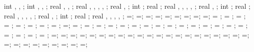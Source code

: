 {{int \showleftpinsup, \showrightpinsup, \showbottompinsup;
int \nbotpin, \ibot, \ijkk;
real \botpinx, \botpinspace, \bottomlength;
real \lefttriw, \leftlinew, \leftlined, \leftlinet, \leftradratio;
real \leftxvalue, \leftyvalue;
int \leftshowcircle;
real \leftrotpin;
real \righttriw, \rightlinew, \rightlined, \rightlinet, \rightradratio;
real \rightxvalue, \rightyvalue;
int \rightshowcircle;
real \rightrotpin;
real \bottomtriw, \bottomlinew, \bottomlined, \bottomlinet, \bottomradratio;
real \bottomxvalue, \bottomyvalue;
int \bottomshowcircle;
real \bottomrotpin;
real \hsdistleft, \hsdistright, \hsdistbottom, \hsinnerlinethk, \thinlinethk;
\hsdistleft=\hsdistleft;
\hsdistright=\hsdistright;
\hsdistbottom=\hsdistbottom;
\hsinnerlinethk=\hsinnerlinethk;
\thinlinethk=\thinlinethk;
\hsdistleft=\hsdistleft;
\hsdistright=\hsdistright;
\hsdistbottom=\hsdistbottom;
\hsinnerlinethk=\hsinnerlinethk;
\storyheight = \storyheight;
\baywidth = \baywidth;
\startx = \startx;
\starty = \starty;
\supportwidth = \supportwidth;
\supportheight = \supportheight;
\isolationwidth = \isolationwidth;
\isolationdepth = \isolationdepth;
\isoshift=\isoshift;
\foundationdepth = \foundationdepth;
\linet = \linet;
\beamlinet = \beamlinet;
\collinet = \collinet;
\baselinet = \baselinet;
\isolinet = \isolinet;
\massrad = \massrad;
\foundsidew = \foundsidew;
\leftsoildist = \leftsoildist;
\rightsoildist = \rightsoildist;
\leftsoildepth = \leftsoildepth;
\rightsoildepth = \rightsoildepth;
\soilbelowfound = \soilbelowfound;
\leftcontrolx = \leftcontrolx;
\leftcontroly = \leftcontroly;
\rightcontrolx = \rightcontrolx;
\rightcontroly = \rightcontroly;
\axeslenX = \axeslenX;
\axeslenY = \axeslenY;
\piledepth=\piledepth;
\pilesidespace=\pilesidespace;
\pilediameter=\pilediameter;
\pilelinethickness=\pilelinethickness;
\pblinet=\pblinet;
\latloadshift=\latloadshift;
\toparrlen=\toparrlen;
\basearrlen=\basearrlen;
\drift=\drift;
=;
=;
=;
\engbedrockdepth=\engbedrockdepth;
\engbedrockleftdist=\engbedrockleftdist;
\engbedrockrightdist=\engbedrockrightdist;
\engbedrocklinewidth=\engbedrocklinewidth;
\translayerlinet=\translayerlinet;
\ssinterlinet=\ssinterlinet;
\markssexspace=\markssexspace;
\markssrad=\markssrad;
\marksslinet=\marksslinet;
\supershadespace=\supershadespace;
\shearwalllinet=\shearwalllinet;
\marksuperexspace=\marksuperexspace;
\marksuperrad=\marksuperrad;
\marksuperlinet=\marksuperlinet;
\phorspbtwspr=\phorspbtwspr;
\phorspringspace=\phorspringspace;
\phortextshiftx=\phortextshiftx;
\phortextshifty=\phortextshifty;
}}

